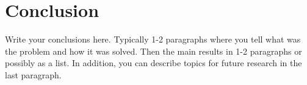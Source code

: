 \chapter{Conclusion}\label{chap:concl}

Write your conclusions here. Typically 1-2 paragraphs where you tell
what was the problem and how it was solved. Then the main results in
1-2 paragraphs or possibly as a list. In addition, you can describe 
topics for future research in the last paragraph.
